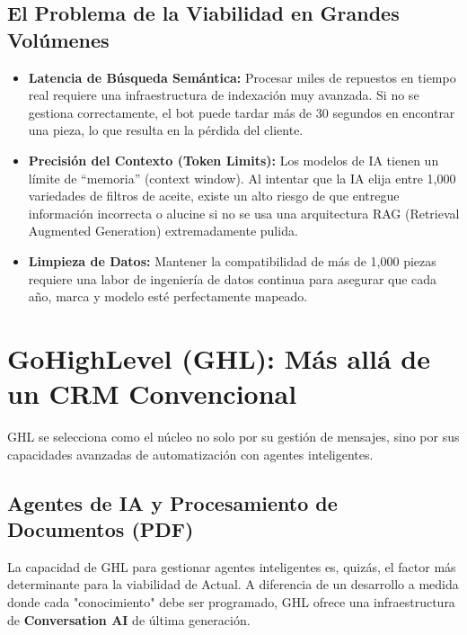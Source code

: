 \documentclass[12pt,a4paper]{article}
\begin{document}
\subsection{El Problema de la Viabilidad en Grandes Volúmenes}
\begin{itemize}
    \item \textbf{Latencia de Búsqueda Semántica:} Procesar miles de repuestos en tiempo real requiere una infraestructura de indexación muy avanzada. Si no se gestiona correctamente, el bot puede tardar más de 30 segundos en encontrar una pieza, lo que resulta en la pérdida del cliente.
    \item \textbf{Precisión del Contexto (Token Limits):} Los modelos de IA tienen un límite de ``memoria'' (context window). Al intentar que la IA elija entre 1,000 variedades de filtros de aceite, existe un alto riesgo de que entregue información incorrecta o alucine si no se usa una arquitectura RAG (Retrieval Augmented Generation) extremadamente pulida.
    \item \textbf{Limpieza de Datos:} Mantener la compatibilidad de más de 1,000 piezas requiere una labor de ingeniería de datos continua para asegurar que cada año, marca y modelo esté perfectamente mapeado.
\end{itemize}

\section{GoHighLevel (GHL): Más allá de un CRM Convencional}
GHL se selecciona como el núcleo no solo por su gesti\'on de mensajes, sino por sus capacidades avanzadas de automatización con agentes inteligentes.

\subsection{Agentes de IA y Procesamiento de Documentos (PDF)}
La capacidad de GHL para gestionar agentes inteligentes es, quizás, el factor más determinante para la viabilidad de Actual. A diferencia de un desarrollo a medida donde cada "conocimiento" debe ser programado, GHL ofrece una infraestructura de \textbf{Conversation AI} de última generación.
\end{document}
